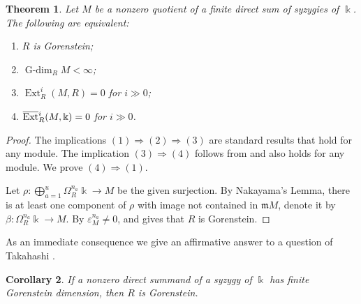 \documentclass{amsart}
\newtheorem{theorem}{Theorem}[section]
\newtheorem{corollary}[theorem]{Corollary}
\theoremstyle{definition}
\theoremstyle{definition}
\theoremstyle{remark}
\numberwithin{equation}{section}
\newcommand{\kk}{\Bbbk}
\newcommand{\Ext}{\operatorname{Ext}}
\newcommand{\bExt}{\overline{\operatorname{Ext}}{\vphantom E}}
\newcommand{\gdim}{\operatorname{G-dim}}
\newcommand{\m}{\mathfrak{m}}
\begin{document}
\begin{theorem}
Let $M$ be a nonzero quotient of a finite direct sum of syzygies of $\kk$. The following are equivalent:
\begin{enumerate}
\item $R$ is Gorenstein;
\item $\gdim_RM<\infty$;
\item $\Ext_R^i(M,R)=0$ for $i\gg0$;
\item $\bExt_R^i(M,\kk)=0$ for $i\gg0$.
\end{enumerate}
\end{theorem}
\begin{proof}
The implications $(1)\Rightarrow(2)\Rightarrow(3)$ are standard results that hold for any module. The implication $(3)\Rightarrow(4)$ follows from  and also holds for any module. We prove $(4)\Rightarrow(1)$.

Let $\rho:\bigoplus_{a=1}^u\Omega_R^{n_a}\kk\rightarrow M$ be the given surjection. By Nakayama's Lemma, there is at least one component of $\rho$ with image not contained in $\m M$, denote it by $\beta:\Omega_R^{n_a}\kk\rightarrow M$. By  $\varepsilon_M^{n_a}\neq0$, and  gives that $R$ is Gorenstein.
\end{proof}

As an immediate consequence we give an affirmative answer to a question of Takahashi \cite[Question 1.0.2]{tak}.

\begin{corollary}
If a nonzero direct summand of a syzygy of $\kk$ has finite Gorenstein dimension, then $R$ is Gorenstein.
\end{corollary}




\end{document}
